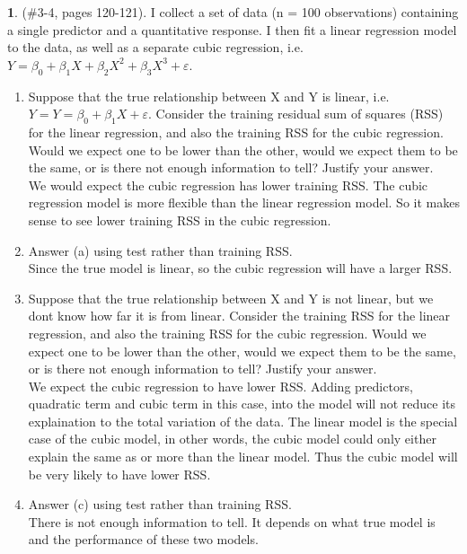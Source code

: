 \documentclass[12pt,fleqn]{article}\usepackage[]{graphicx}\usepackage[]{color}
\theoremstyle{definition}
\newtheorem{problem}{}
\begin{document}
	\begin{problem} (\#3-4, pages 120-121). I collect a set of data (n = 100 observations) containing a single predictor and a quantitative response. I then fit a linear regression model to the data, as well as a separate cubic regression, i.e. $Y = \beta_0 + \beta_1X + \beta_2X^2 + \beta_3X^3 + \varepsilon$.
	  \begin{enumerate}
	    \item Suppose that the true relationship between X and Y is linear, i.e. $Y = Y = \beta_0 + \beta_1X + \varepsilon$. Consider the training residual sum of squares (RSS) for the linear regression, and also the training RSS for the cubic regression. Would we expect one to be lower than the other, would we expect them to be the same, or is there not enough information to tell? Justify your answer.\\[5pt]
	    We would expect the cubic regression has lower training RSS. The cubic regression model is more flexible than the linear regression model. So it makes sense to see lower training RSS in the cubic regression.
	    \item Answer (a) using test rather than training RSS.\\[5pt]
	      Since the true model is linear, so the cubic regression will have a larger RSS.
	    \item Suppose that the true relationship between X and Y is not linear, but we dont know how far it is from linear. Consider the training RSS for the linear regression, and also the training RSS for the cubic regression. Would we expect one to be lower than the other, would we expect them to be the same, or is there not enough information to tell? Justify your answer.\\[5pt]
	    We expect the cubic regression to have lower RSS. Adding predictors, quadratic term and cubic term in this case, into the model will not reduce its explaination to the total variation of the data. The linear model is the special case of the cubic model, in other words, the cubic model could only either explain the same as or more than the linear model. Thus the cubic model will be very likely to have lower RSS.
	    \item Answer (c) using test rather than training RSS.\\[5pt]
	      There is not enough information to tell. It depends on what true model is and the performance of these two models.
	  \end{enumerate}
	\end{problem}
\end{document}
